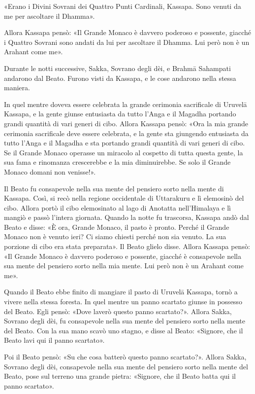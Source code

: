 «Erano i Divini Sovrani dei Quattro Punti Cardinali, Kassapa. Sono
venuti da me per ascoltare il Dhamma».


Allora Kassapa pensò: «Il Grande Monaco è davvero poderoso e possente,
giacché i Quattro Sovrani sono andati da lui per ascoltare il Dhamma.
Lui però non è un Arahant come me».


Durante le notti successive, Sakka, Sovrano degli dèi, e Brahmā
Sahampati andarono dal Beato. Furono visti da Kassapa, e le cose
andarono nella stessa maniera.


In quel mentre doveva essere celebrata la grande cerimonia sacrificale
di Uruvelā Kassapa, e la gente giunse entusiasta da tutto l’Anga e il
Magadha portando grandi quantità di vari generi di cibo. Allora Kassapa
pensò: «Ora la mia grande cerimonia sacrificale deve essere celebrata, e
la gente sta giungendo entusiasta da tutto l’Anga e il Magadha e sta
portando grandi quantità di vari generi di cibo. Se il Grande Monaco
operasse un miracolo al cospetto di tutta questa gente, la sua fama e
rinomanza crescerebbe e la mia diminuirebbe. Se solo il Grande Monaco
domani non venisse!».


Il Beato fu consapevole nella sua mente del pensiero sorto nella mente
di Kassapa. Così, si recò nella regione occidentale di Uttarakuru e lì
elemosinò del cibo. Allora portò il cibo elemosinato al lago di Anotatta
nell’Himalaya e lì mangiò e passò l’intera giornata. Quando la notte fu
trascorsa, Kassapa andò dal Beato e disse: «È ora, Grande Monaco, il
pasto è pronto. Perché il Grande Monaco non è venuto ieri? Ci siamo
chiesti perché non sia venuto. La sua porzione di cibo era stata
preparata». Il Beato glielo disse. Allora Kassapa pensò: «Il Grande
Monaco è davvero poderoso e possente, giacché è consapevole nella sua
mente del pensiero sorto nella mia mente. Lui però non è un Arahant come
me».


Quando il Beato ebbe finito di mangiare il pasto di Uruvelā Kassapa,
tornò a vivere nella stessa foresta. In quel mentre un panno scartato
giunse in possesso del Beato. Egli pensò: «Dove laverò questo panno
scartato?». Allora Sakka, Sovrano degli dèi, fu consapevole nella sua
mente del pensiero sorto nella mente del Beato. Con la sua mano scavò
uno stagno, e disse al Beato: «Signore, che il Beato lavi qui il panno
scartato».


Poi il Beato pensò: «Su che cosa batterò questo panno scartato?». Allora
Sakka, Sovrano degli dèi, consapevole nella sua mente del pensiero sorto
nella mente del Beato, pose sul terreno una grande pietra: «Signore, che
il Beato batta qui il panno scartato».


